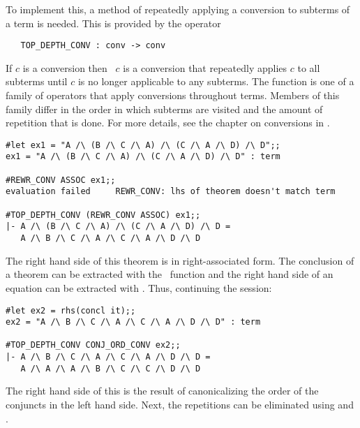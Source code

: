 To implement this, a method of repeatedly applying a conversion to
subterms of a term is needed. This is provided by the operator

\begin{hol}\begin{verbatim}
   TOP_DEPTH_CONV : conv -> conv
\end{verbatim}\end{hol}

\noindent If $c$ is a conversion then ~$c$ is a
conversion that repeatedly applies $c$ to all subterms until $c$ is no
longer applicable to any subterms. The function 
is one of a family of operators that apply conversions throughout 
terms. Members of this family differ in the order in which subterms
are visited and the amount of repetition that is done. For more
details, see the chapter on conversions in \DESCRIPTION.

\begin{session}\begin{verbatim}
#let ex1 = "A /\ (B /\ C /\ A) /\ (C /\ A /\ D) /\ D";;
ex1 = "A /\ (B /\ C /\ A) /\ (C /\ A /\ D) /\ D" : term

#REWR_CONV ASSOC ex1;;
evaluation failed     REWR_CONV: lhs of theorem doesn't match term

#TOP_DEPTH_CONV (REWR_CONV ASSOC) ex1;;
|- A /\ (B /\ C /\ A) /\ (C /\ A /\ D) /\ D =
   A /\ B /\ C /\ A /\ C /\ A /\ D /\ D
\end{verbatim}\end{session}

\noindent The right hand side of this theorem is  in right-associated
form. The conclusion of a theorem can be extracted with the \ML\ function
 and the right hand side of an equation can be extracted with
. Thus, continuing the session:

\begin{session}\begin{verbatim}
#let ex2 = rhs(concl it);;
ex2 = "A /\ B /\ C /\ A /\ C /\ A /\ D /\ D" : term

#TOP_DEPTH_CONV CONJ_ORD_CONV ex2;;
|- A /\ B /\ C /\ A /\ C /\ A /\ D /\ D =
   A /\ A /\ A /\ B /\ C /\ C /\ D /\ D
\end{verbatim}\end{session}

\noindent The right hand side of this is the result of canonicalizing
the order of the conjuncts in the left hand side. Next, the repetitions
can be eliminated using  and .

